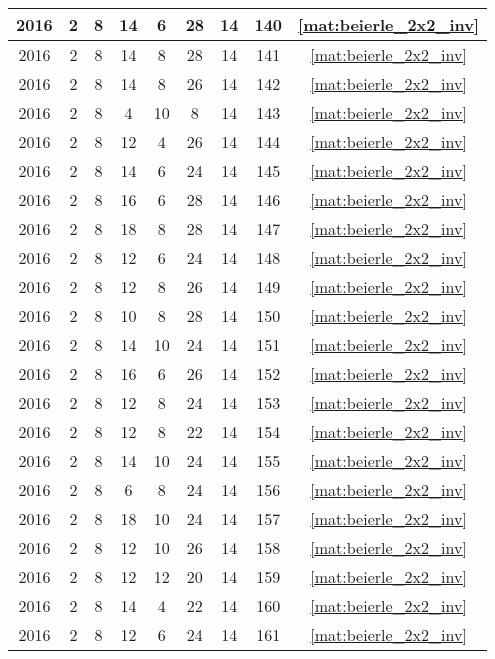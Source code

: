 \begin{longtable}{|c|c|c|c|c|c|c|c|c|}
2016 & 2 & 8 & 14 & 6 & 28 & 14 & 140 & \eqref{mat:beierle_2x2_inv} \\ \hline 
2016 & 2 & 8 & 14 & 8 & 28 & 14 & 141 & \eqref{mat:beierle_2x2_inv} \\ \hline 
2016 & 2 & 8 & 14 & 8 & 26 & 14 & 142 & \eqref{mat:beierle_2x2_inv} \\ \hline 
2016 & 2 & 8 & 4 & 10 & 8 & 14 & 143 & \eqref{mat:beierle_2x2_inv} \\ \hline 
2016 & 2 & 8 & 12 & 4 & 26 & 14 & 144 & \eqref{mat:beierle_2x2_inv} \\ \hline 
2016 & 2 & 8 & 14 & 6 & 24 & 14 & 145 & \eqref{mat:beierle_2x2_inv} \\ \hline 
2016 & 2 & 8 & 16 & 6 & 28 & 14 & 146 & \eqref{mat:beierle_2x2_inv} \\ \hline 
2016 & 2 & 8 & 18 & 8 & 28 & 14 & 147 & \eqref{mat:beierle_2x2_inv} \\ \hline 
2016 & 2 & 8 & 12 & 6 & 24 & 14 & 148 & \eqref{mat:beierle_2x2_inv} \\ \hline 
2016 & 2 & 8 & 12 & 8 & 26 & 14 & 149 & \eqref{mat:beierle_2x2_inv} \\ \hline 
2016 & 2 & 8 & 10 & 8 & 28 & 14 & 150 & \eqref{mat:beierle_2x2_inv} \\ \hline 
2016 & 2 & 8 & 14 & 10 & 24 & 14 & 151 & \eqref{mat:beierle_2x2_inv} \\ \hline 
2016 & 2 & 8 & 16 & 6 & 26 & 14 & 152 & \eqref{mat:beierle_2x2_inv} \\ \hline 
2016 & 2 & 8 & 12 & 8 & 24 & 14 & 153 & \eqref{mat:beierle_2x2_inv} \\ \hline 
2016 & 2 & 8 & 12 & 8 & 22 & 14 & 154 & \eqref{mat:beierle_2x2_inv} \\ \hline 
2016 & 2 & 8 & 14 & 10 & 24 & 14 & 155 & \eqref{mat:beierle_2x2_inv} \\ \hline 
2016 & 2 & 8 & 6 & 8 & 24 & 14 & 156 & \eqref{mat:beierle_2x2_inv} \\ \hline 
2016 & 2 & 8 & 18 & 10 & 24 & 14 & 157 & \eqref{mat:beierle_2x2_inv} \\ \hline 
2016 & 2 & 8 & 12 & 10 & 26 & 14 & 158 & \eqref{mat:beierle_2x2_inv} \\ \hline 
2016 & 2 & 8 & 12 & 12 & 20 & 14 & 159 & \eqref{mat:beierle_2x2_inv} \\ \hline 
2016 & 2 & 8 & 14 & 4 & 22 & 14 & 160 & \eqref{mat:beierle_2x2_inv} \\ \hline 
2016 & 2 & 8 & 12 & 6 & 24 & 14 & 161 & \eqref{mat:beierle_2x2_inv} \\ \hline 

\end{longtable}
